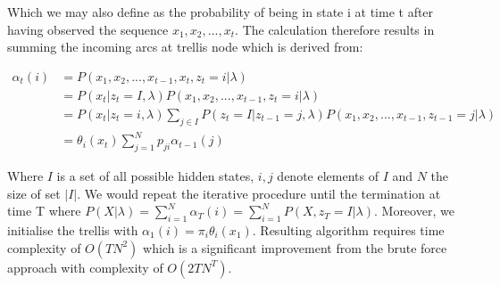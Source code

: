 Which we may also define as the probability of being in state i at time t after having observed the sequence ${x_1,x_2,...,x_t}$. The calculation therefore results in summing the incoming arcs at trellis node which is derived from:

\begin{align}
\alpha_t(i) &= P(x_1,x_2,...,x_{t-1},x_t,z_t=i |\lambda) \\ \nonumber
&= P(x_t|z_t=I, \lambda) P(x_1,x_2,...,x_{t-1},z_t=i |\lambda)  \\ \nonumber
&= P(x_t|z_t=i, \lambda) \sum_{j \in I} P(z_t = I| z_{t-1}=j,\lambda) P(x_1,x_2,...,x_{t-1},z_{t-1}=j |\lambda) \\ \nonumber
&= \theta_i(x_t) \sum_{j=1}^N p_{ji} \alpha_{t-1}(j)
\end{align}

Where $I$ is a set of all possible hidden states, $i,j$ denote elements of $I$ and $N$ the size of set $|I|$. We would repeat the iterative procedure until the termination at time T where $P(X|\lambda) = \sum_{i=1}^N  \alpha_T(i) = \sum_{i=1}^N P(X,z_T=I|\lambda)$. Moreover, we initialise the trellis with $\alpha_1(i)=\pi_i \theta_i(x_1)$. Resulting algorithm requires time complexity of $O(TN^2)$ which is a significant improvement from the brute force approach with complexity of $O(2TN^T)$.
  
